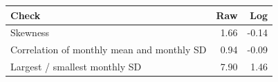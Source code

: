 \begin{tabular}{|l|r|r|}
\hline
\textbf{Check} & \textbf{Raw} & \textbf{Log} \\\hline
Skewness & 1.66 & -0.14 \\\hline
Correlation of monthly mean and monthly SD & 0.94 & -0.09 \\\hline
Largest / smallest monthly SD & 7.90 & 1.46 \\\hline
\end{tabular}
